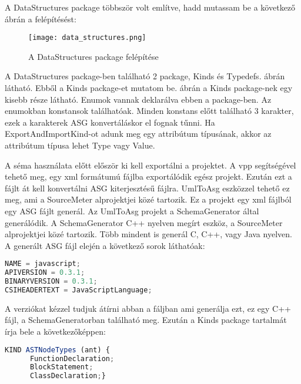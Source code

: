 \noindent

A DataStructures package többször volt említve, hadd mutassam be a következő ábrán a felépítésést:

\begin{figure}[!htbp]
      \caption{A DataStructures package felépítése}\label{fig:data_structures_kinds}
      \centering
      \texttt{[image: data\_structures.png]}
\end{figure}

A DataStructures package-ben található 2 package, Kinds és Typedefs.  ábrán látható. Ebből a Kinds package-et mutatom be.
 ábrán a Kinds package-nek egy kisebb része látható.
Enumok vannak deklarálva ebben a package-ben.
Az enumokban konstansok találhatóak. Minden konstans előtt található 3 karakter, ezek a karakterek ASG konvertáláskor el fognak tűnni.
Ha ExportAndImportKind-ot adunk meg egy attribútum típusának, akkor az attribútum típusa lehet Type vagy Value.

\noindent

A séma használata előtt először ki kell exportálni a projektet. A vpp segítségével tehető meg, egy xml formátumú fájlba exportálódik egész projekt.
Ezután ezt a fájlt át kell konvertálni ASG kiterjesztésű fájlra.
UmlToAsg eszközzel tehető ez meg, ami a SourceMeter alprojektjei közé tartozik.
Ez a projekt egy xml fájlból egy ASG fájlt generál.
Az UmlToAsg projekt a SchemaGenerator által generálódik.
A SchemaGenerator C++ nyelven megírt eszköz, a SourceMeter alprojektjei közé tartozik.
Több mindent is generál C, C++, vagy Java nyelven.
A generált ASG fájl elején a következő sorok láthatóak:

\begin{lstlisting}[caption={ASG fájl első sorai},label={lst:asg_file_eleje}, language={JavaScript}]
NAME = javascript;
APIVERSION = 0.3.1;
BINARYVERSION = 0.3.1;
CSIHEADERTEXT = JavaScriptLanguage;
\end{lstlisting}

A verziókat kézzel tudjuk átírni abban a fáljban ami generálja ezt, ez egy C++ fájl, a SchemaGeneratorban található meg.
Ezután a Kinds package tartalmát írja bele a következőképpen:

\begin{lstlisting}[caption={ASG fájl kind},label={lst:asg_file_kinds}, language={JavaScript}]
KIND ASTNodeTypes (ant) {
      FunctionDeclaration;
      BlockStatement;
      ClassDeclaration;}
\end{lstlisting}

